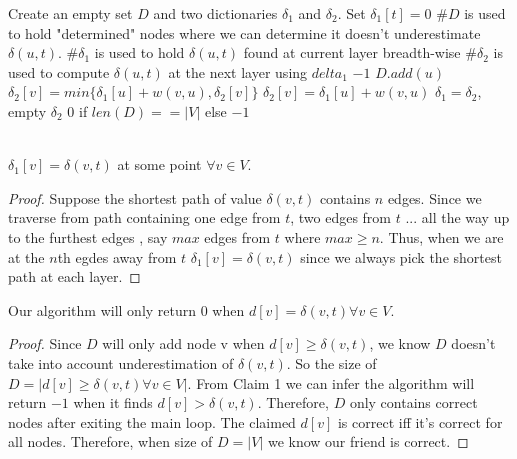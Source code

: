 \documentclass[11pt]{article}
\begin{document}
\begin{algorithm}
	\begin{algorithmic}
		\State Create an empty set $D$ and two dictionaries $\delta_1$ and $\delta_2$. Set $\delta_1[t] = 0$
		\State \#$D$ is used to hold "determined" nodes where we can determine it doesn't underestimate $\delta(u, t)$.
		\State \#$\delta_1$ is used to hold $\delta(u, t)$ found at current layer breadth-wise
		\State \#$\delta_2$ is used to compute $\delta(u, t)$ at the next layer using $delta_1$
				\State \Return $-1$
				\State $D.add(u)$
			\EndIf
					\State $\delta_2[v] = min\{\delta_1[u] + w(v, u), \delta_2[v]\}$
				\Else
					\State $\delta_2[v] = \delta_1[u] + w(v, u)$
				\EndIf
			\EndFor
				\State $\delta_1 = \delta_2$, empty $\delta_2$
			\EndIf
		\EndFor
		\State \Return $0$ if $len(D) == |V|$ else $-1$
	\end{algorithmic}
\end{algorithm}

\\

 $\delta_1[v] = \delta(v, t)$ at some point $\forall v \in V$.

\begin{proof}
	
Suppose the shortest path of value $\delta(v, t)$ contains $n$ edges. Since we traverse from path containing one edge from $t$, two edges from $t$ ... all the way up to the furthest edges , say $max$ edges from $t$ where $max \geq n$. Thus, when we are at the $n$th egdes away from $t$ $\delta_1[v] = \delta(v, t)$ since we always pick the shortest path at each layer.	

\end{proof}

 Our algorithm will only return $0$ when $d[v] = \delta(v, t) \forall v \in V$.

\begin{proof}
	
Since $D$ will only add node v when $d[v] \geq \delta(v, t)$, we know $D$ doesn't take into account underestimation of $\delta(v, t)$. So the size of $D = |d[v] \geq \delta(v, t) \forall v \in V|$. From Claim 1 we can infer the algorithm will return $-1$ when it finds $d[v] > \delta(v, t)$. Therefore, $D$ only contains correct nodes after exiting the main loop. The claimed $d[v]$ is correct iff it's correct for all nodes. Therefore, when size of $D = |V|$ we know our friend is correct.

\end{proof}
\end{document}
